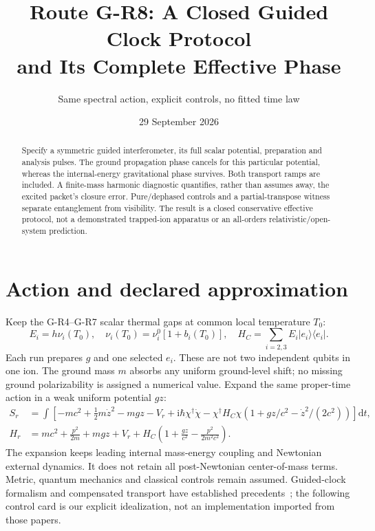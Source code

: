 \documentclass[11pt,a4paper]{article}
\title{Route G-R8: A Closed Guided Clock Protocol\\and Its Complete Effective Phase}
\author{Same spectral action, explicit controls, no fitted time law}
\date{29 September 2026}
\newcommand{\dd}{\mathrm d}
\newcommand{\ii}{\mathrm i}
\begin{document}
\maketitle
\begin{abstract}
Specify a symmetric guided interferometer, its full scalar potential,
preparation and analysis pulses. The ground propagation phase cancels
for this particular potential, whereas the internal-energy gravitational
phase survives. Both transport ramps are included. A finite-mass harmonic
diagnostic quantifies, rather than assumes away, the excited packet's
closure error. Pure/dephased controls and a partial-transpose witness
separate entanglement from visibility. The result is a closed conservative
effective protocol, not a demonstrated trapped-ion apparatus or an
all-orders relativistic/open-system prediction.
\end{abstract}

\section{Action and declared approximation}
Keep the G-R4--G-R7 scalar thermal gaps at common local temperature $T_0$:
\begin{equation}
 E_i=h\nu_i(T_0),\quad \nu_i(T_0)=\nu_i^0[1+b_i(T_0)],\quad
 H_C=\sum_{i=2,3}E_i|e_i\rangle\langle e_i| .
\end{equation}
Each run prepares $g$ and one selected $e_i$. These are not two independent
qubits in one ion. The ground mass $m$ absorbs any uniform ground-level
shift; no missing ground polarizability is assigned a numerical value.
Expand the same proper-time action in a weak uniform potential $gz$:
\begin{align}
 S_r&=\int\left[-mc^2+\tfrac12m\dot z^2-mgz-V_r
       +\ii\hbar\chi^\dagger\dot\chi
       -\chi^\dagger H_C\chi
          (1+gz/c^2-\dot z^2/(2c^2))\right]\dd t,\label{action}\\
 H_r&=mc^2+\frac{p^2}{2m}+mgz+V_r+
       H_C\left(1+\frac{gz}{c^2}-\frac{p^2}{2m^2c^2}\right).
       \label{ham}
\end{align}
The expansion keeps leading internal mass-energy coupling and Newtonian
external dynamics. It does not retain all post-Newtonian center-of-mass
terms. Metric, quantum mechanics and classical controls remain assumed.
Guided-clock formalism and compensated transport have established
precedents~\cite{roura,transport}; the following control card is our
explicit idealization, not an implementation imported from those papers.
\end{document}
